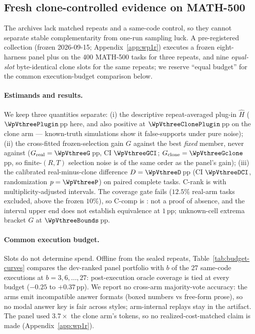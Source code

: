 
\subsection{Fresh clone-controlled evidence on MATH-500}\label{sec:wp1r}

The archives lack matched repeats and a same-code control, so they
cannot separate stable complementarity from one-run sampling luck. A
pre-registered collection (frozen 2026-09-15; Appendix~\ref{app:wp1r})
executes a frozen eight-harness panel plus \bare{} on the 400 MATH-500
tasks for three repeats, and nine \emph{equal-slot} byte-identical
\bare{} clone slots for the same repeats; we reserve ``equal budget''
for the common execution-budget comparison below.

\paragraph{Estimands and results.}
We keep three quantities separate: (i) the descriptive repeat-averaged
plug-in $\widehat H$ ($\WpVthreePlugin$\,pp here, and also positive at
$\WpVthreeClonePlugin$\,pp on the clone arm --- known-truth simulations
show it false-supports under pure noise); (ii) the cross-fitted
frozen-selection gain $G$ against the best \emph{fixed} member, never
against \bare{} ($G_{\rm real}=\WpVthreeG$\,pp, CI $\WpVthreeGCI$;
$G_{\rm clone}=\WpVthreeGclone$\,pp, so finite-$(R,T)$ selection noise
is of the same order as the panel's gain); (iii) the calibrated
real-minus-clone difference $D=\WpVthreeD$\,pp (CI $\WpVthreeDCI$,
randomization $p=\WpVthreeP$) on \WpVthreeNPaired{} paired complete
tasks. C-rank is \textsc{\WpCrankState} with multiplicity-adjusted
intervals. The coverage gate fails ($12.5\%$ real-arm tasks excluded,
above the frozen $10\%$), so C-comp is \textsc{\WpVthreeState}: not a
proof of absence, and the interval upper end does not establish
equivalence at $1$\,pp; unknown-cell extrema bracket $G$ at
$\WpVthreeBounds$\,pp.

\paragraph{Common execution budget.}
Slots do not determine spend. Offline from the sealed repeats,
Table~\ref{tab:budget-curves} compares the dev-ranked panel portfolio
with $b$ of the 27 same-code executions at $b=3,6,\ldots,27$:
post-execution oracle coverage is tied at every budget
($-0.25$ to $+0.37$\,pp). We report no cross-arm majority-vote
accuracy: the arms emit incompatible answer formats (boxed numbers vs
free-form prose), so no modal answer key is fair across styles;
arm-internal replays stay in the artifact. The panel used
$3.7\times$ the clone arm's tokens, so no realized-cost-matched claim
is made (Appendix~\ref{app:wp1r}).

